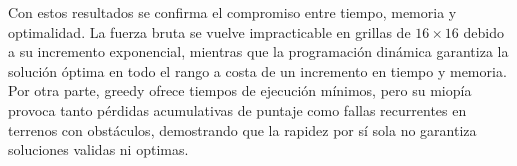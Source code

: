 
Con estos resultados se confirma el compromiso entre tiempo, memoria y optimalidad. La fuerza bruta se vuelve impracticable 
en grillas de $16\times16$ debido a su incremento exponencial,
mientras que la programación dinámica garantiza la solución óptima en todo el rango a costa de un incremento 
en tiempo y memoria. Por otra parte, greedy ofrece tiempos de ejecución mínimos, pero su miopía 
provoca tanto pérdidas acumulativas de puntaje como fallas recurrentes en terrenos con obstáculos, 
demostrando que la rapidez por sí sola no garantiza soluciones validas ni optimas.